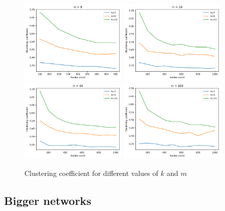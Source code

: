 \documentclass[12pt]{article}
\begin{document}
\begin{figure}[H]
    \centering
    \includegraphics[width=0.45\textwidth]{assets/avg_clustering_m9.png} 
    \includegraphics[width=0.45\textwidth]{assets/avg_clustering_m10.png} 
    \includegraphics[width=0.45\textwidth]{assets/avg_clustering_m64.png}
    \includegraphics[width=0.45\textwidth]{assets/avg_clustering_m160.png}
    \caption{Clustering coefficient for different values of $k$ and $m$}
    \label{fig:avg_clustering}
\end{figure}

\pagebreak

\subsection{Bigger networks}
\end{document}
